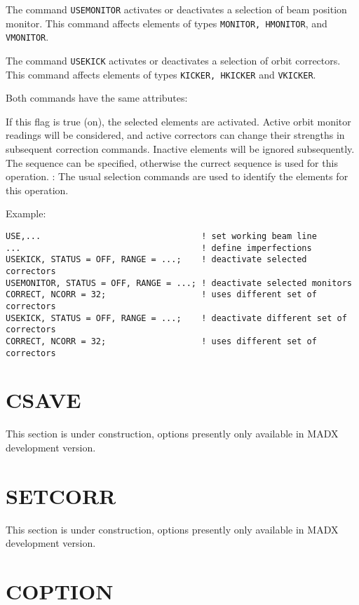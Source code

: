 The command \texttt{USEMONITOR} activates or deactivates a
selection of beam position monitor. 
This command affects elements of types \texttt{MONITOR, HMONITOR},
and \texttt{VMONITOR}.    

The command  \texttt{USEKICK} activates or deactivates a selection
of orbit correctors. This command
affects elements of types \texttt{KICKER, HKICKER} and \texttt{VKICKER}. 


Both commands have the same attributes: 
\begin{madlist}
    If this flag is true (on), the selected elements
     are activated. Active orbit monitor readings will be
     considered, and active correctors can change their strengths
     in subsequent correction commands. Inactive elements will be
     ignored subsequently.  
    The sequence can be specified, otherwise the
     currect sequence is used for this operation.  
   : The usual selection commands are
     used to identify the elements for this operation.  
\end{madlist} 

Example:
\begin{verbatim}
USE,...                                ! set working beam line 
...                                    ! define imperfections 
USEKICK, STATUS = OFF, RANGE = ...;    ! deactivate selected correctors 
USEMONITOR, STATUS = OFF, RANGE = ...; ! deactivate selected monitors   
CORRECT, NCORR = 32;                   ! uses different set of correctors
USEKICK, STATUS = OFF, RANGE = ...;    ! deactivate different set of correctors 
CORRECT, NCORR = 32;                   ! uses different set of correctors
\end{verbatim}


%
\section{CSAVE}
\label{sec:csave}
 This section is under construction, options presently only available in
 MADX development version.  

\section{SETCORR}
\label{sec:setcorr}
 This section is under construction, options presently only available in
 MADX development version.  


% 
\section{COPTION}
\label{sec:coption}

